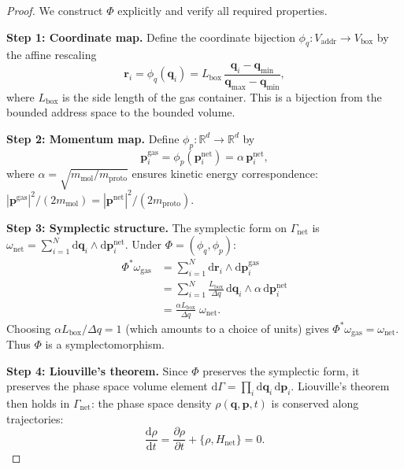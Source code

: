 \documentclass[11pt,twocolumn,a4paper]{article}
\theoremstyle{definition}
\theoremstyle{remark}
\newcommand{\Vaddr}{V_{\mathrm{addr}}}
\newcommand{\mpr}{m_{\mathrm{proto}}}
\newcommand{\Hnet}{H_{\mathrm{net}}}
\newcommand{\dd}{\mathrm{d}}
\newcommand{\pder}[2]{\frac{\partial #1}{\partial #2}}
\begin{document}
\begin{proof}
We construct $\Phi$ explicitly and verify all required properties.

\medskip\noindent\textbf{Step 1: Coordinate map.}
Define the coordinate bijection $\phi_{q}:\Vaddr\to V_{\mathrm{box}}$ by
the affine rescaling
\begin{equation}\label{eq:coord_map}
  \bm{r}_i = \phi_{q}(\bm{q}_i) =
  L_{\mathrm{box}}\,\frac{\bm{q}_i - \bm{q}_{\min}}
  {\bm{q}_{\max}-\bm{q}_{\min}},
\end{equation}
where $L_{\mathrm{box}}$ is the side length of the gas container.  This is a
bijection from the bounded address space to the bounded volume.

\medskip\noindent\textbf{Step 2: Momentum map.}
Define $\phi_{p}:\mathbb{R}^d\to\mathbb{R}^d$ by
\begin{equation}\label{eq:mom_map}
  \bm{p}_i^{\mathrm{gas}} = \phi_{p}(\bm{p}_i^{\mathrm{net}})
  = \alpha\,\bm{p}_i^{\mathrm{net}},
\end{equation}
where $\alpha=\sqrt{m_{\mathrm{mol}}/\mpr}$ ensures kinetic energy
correspondence: $|\bm{p}^{\mathrm{gas}}|^2/(2m_{\mathrm{mol}})=
|\bm{p}^{\mathrm{net}}|^2/(2\mpr)$.

\medskip\noindent\textbf{Step 3: Symplectic structure.}
The symplectic form on $\Gamma_{\mathrm{net}}$ is
$\omega_{\mathrm{net}}=\sum_{i=1}^{N}\dd\bm{q}_i\wedge\dd\bm{p}_i^{\mathrm{net}}$.
Under $\Phi=(\phi_q,\phi_p)$:
\begin{align}
  \Phi^{*}\omega_{\mathrm{gas}}
  &= \sum_{i=1}^{N}\dd\bm{r}_i\wedge\dd\bm{p}_i^{\mathrm{gas}} \nonumber\\
  &= \sum_{i=1}^{N}
     \frac{L_{\mathrm{box}}}{\Delta q}\,\dd\bm{q}_i
     \wedge
     \alpha\,\dd\bm{p}_i^{\mathrm{net}} \nonumber\\
  &= \frac{\alpha L_{\mathrm{box}}}{\Delta q}\;\omega_{\mathrm{net}}.
     \label{eq:symplectic}
\end{align}
Choosing $\alpha L_{\mathrm{box}}/\Delta q=1$ (which amounts to a choice of
units) gives $\Phi^{*}\omega_{\mathrm{gas}}=\omega_{\mathrm{net}}$.  Thus
$\Phi$ is a symplectomorphism.

\medskip\noindent\textbf{Step 4: Liouville's theorem.}
Since $\Phi$ preserves the symplectic form, it preserves the phase space
volume element $\dd\Gamma=\prod_i\dd\bm{q}_i\,\dd\bm{p}_i$.  Liouville's
theorem~\cite{Liouville1838,Goldstein2002} then holds in
$\Gamma_{\mathrm{net}}$: the phase space density $\rho(\bm{q},\bm{p},t)$ is
conserved along trajectories:
\begin{equation}\label{eq:liouville}
  \frac{\dd\rho}{\dd t}
  = \pder{\rho}{t}+\{\rho,\Hnet\}=0.
\end{equation}


\end{proof}
\end{document}
